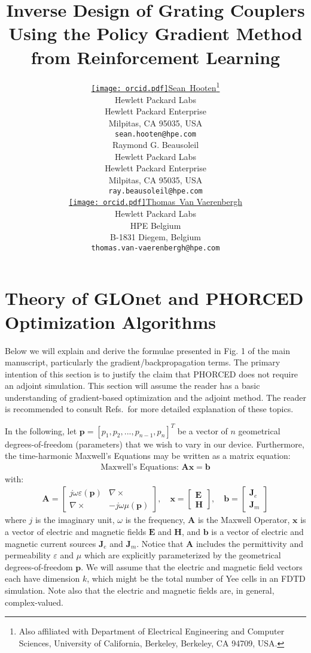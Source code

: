 \documentclass{article}
\title{Inverse Design of Grating Couplers Using the Policy Gradient Method from Reinforcement Learning}
\author{ \href{https://orcid.org/0000-0003-1260-412X}{\texttt{[image: orcid.pdf]}\hspace{1mm}Sean~Hooten}\thanks{Also affiliated with Department of Electrical Engineering and Computer Sciences, University of California, Berkeley, Berkeley, CA 94709, USA.}
		\\
	Hewlett Packard Labs \\
	Hewlett Packard Enterprise \\
	Milpitas, CA 95035, USA \\
	\texttt{sean.hooten@hpe.com} \\
	\And
    Raymond G. Beausoleil \\
	Hewlett Packard Labs\\
	Hewlett Packard Enterprise \\
	Milpitas, CA 95035, USA \\
	\texttt{ray.beausoleil@hpe.com} \\
	\And
	\href{https://orcid.org/0000-0002-7301-8610}{\texttt{[image: orcid.pdf]}\hspace{1mm}Thomas~Van Vaerenbergh} \\
	Hewlett Packard Labs\\
	HPE Belgium\\
	B-1831 Diegem, Belgium \\
	\texttt{thomas.van-vaerenbergh@hpe.com}
}
\date{}
\begin{document}
\maketitle


\renewcommand{\theequation}{S.\arabic{equation}}
\renewcommand\thefigure{S\arabic{figure}}

\section{Theory of GLOnet and PHORCED Optimization Algorithms}
Below we will explain and derive the formulae presented in Fig. 1 of the main manuscript, particularly the gradient/backpropagation terms. The primary intention of this section is to justify the claim that PHORCED does not require an adjoint simulation. This section will assume the reader has a basic understanding of gradient-based optimization and the adjoint method. The reader is recommended to consult Refs.\,\cite{michaels_inverse_2018, su_fully-automated_2017, hooten_adjoint_2020, sun_adjoint-method-inspired_2020, dezfouli_design_2021} for more detailed explanation of these topics.

In the following, let $\mathbf{p}=[p_1, p_2,...,p_{n-1},p_n]^T$ be a vector of $n$ geometrical degrees-of-freedom (parameters) that we wish to vary in our device. Furthermore, the time-harmonic Maxwell's Equations may be written as a matrix equation:
\begin{align}
    \text{Maxwell's Equations: }\mathbf{A}\mathbf{x}=\mathbf{b}\label{eq:ax_b}
\end{align}
with:
\begin{align}
        \mathbf{A}=\begin{bmatrix}
            j\omega\varepsilon(\mathbf{p}) &  \nabla \times \\
            \nabla \times & -j\omega \mu(\mathbf{p})
        \end{bmatrix}, \quad
        \mathbf{x}=\begin{bmatrix}
            \mathbf{E} \\
            \mathbf{H}
        \end{bmatrix}, \quad
        \mathbf{b}=\begin{bmatrix}
            \mathbf{J}_e \\
            \mathbf{J}_m
        \end{bmatrix} 
\end{align}
where $j$ is the imaginary unit, $\omega$ is the frequency, $\mathbf{A}$ is the Maxwell Operator, $\mathbf{x}$ is a vector of electric and magnetic fields $\mathbf{E}$ and $\mathbf{H}$, and $\mathbf{b}$ is a vector of electric and magnetic current sources $\mathbf{J}_e$ and $\mathbf{J}_m$. Notice that $\mathbf{A}$ includes the permittivity and permeability $\varepsilon$ and $\mu$ which are explicitly parameterized by the geometrical degrees-of-freedom $\mathbf{p}$. We will assume that the electric and magnetic field vectors each have dimension $k$, which might be the total number of Yee cells in an FDTD simulation. Note also that the electric and magnetic fields are, in general, complex-valued.
\end{document}
